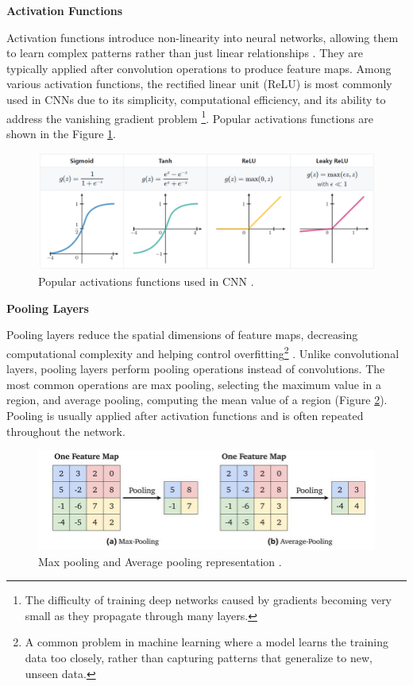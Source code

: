 \documentclass[a4paper,10pt]{book}
\begin{document}
\textbf{Activation Functions}

Activation functions introduce non-linearity into neural networks, allowing them to learn complex patterns rather than just linear relationships \cite{langActivationFunctionsNeural2024}. They are typically applied after convolution operations to produce feature maps. Among various activation functions, the rectified linear unit (ReLU) is most commonly used in CNNs due to its simplicity, computational efficiency, and its ability to address the vanishing gradient problem \footnote{The difficulty of training deep networks caused by gradients becoming very small as they propagate through many layers.}. Popular activations functions are shown in the Figure \ref{fig:activations-functions}.

\begin{figure}
    \centering
    \includegraphics[width=1.0\linewidth]{reports//assets/activations_functions.png}
    \caption[Popular activation functions]{Popular activations functions used in CNN \cite{wachtelUnderstandingActivationFunctions2021}.}
    \label{fig:activations-functions}
\end{figure}

\textbf{Pooling Layers}

Pooling layers reduce the spatial dimensions of feature maps, decreasing computational complexity and helping control overfitting\footnote{A common problem in machine learning where a model learns the training data too closely, rather than capturing patterns that generalize to new, unseen data.} \cite{brownlee_gentle_2019}. Unlike convolutional layers, pooling layers perform pooling operations instead of convolutions. The most common operations are max pooling, selecting the maximum value in a region, and average pooling, computing the mean value of a region (Figure \ref{fig:pooling_operations}). Pooling is usually applied after activation functions and is often repeated throughout the network.


\begin{figure}[h!]
    \centering
    \includegraphics[width=1.0\linewidth]{reports//assets/pooling.png}
    \caption[Popular pooling operations]{Max pooling and Average pooling representation \cite{SkinLesionClassification}.}
    \label{fig:pooling_operations}
\end{figure}
\end{document}
